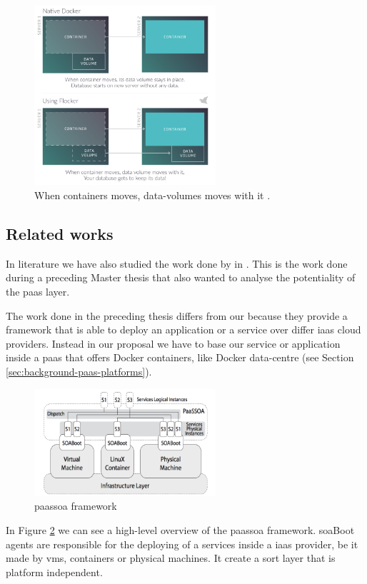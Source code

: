 \begin{figure}[h!]
	\centering{}
	\includegraphics[width=0.6\textwidth]{chapters/architecture/images/flocker.png}
	\caption[Flocker capabilities]{When containers moves, data-volumes moves with it \cite{flockerHomepage}.}
	\label{img:architecture-proposal-architecture-multiTenancy-Flocker}
\end{figure}

\subsection{Related works}
\label{sec:architecture-related}
In literature we have also studied the work done by \citeauthor{baraldo2015reconciling} in
\cite{baraldo2015reconciling}. This is the work done during a preceding Master thesis that also wanted
to analyse the potentiality of the \ac{paas} layer.

The work done in the preceding thesis differs from our because they provide a framework that is able
to deploy an application or a service over differ \ac{iaas} cloud providers. Instead in our proposal
we have to base our service or application inside a \ac{paas} that offers Docker containers, like
Docker data-centre (see Section \ref{sec:background-paas-platforms}).

\begin{figure}
	\centering{}
	\includegraphics[width=0.6\textwidth]{chapters/architecture/images/passsoa.png}
	\caption[\acs{paas}\acs{soa} framework]{\acs{paas}\acs{soa} framework \cite{baraldo2015reconciling}}
	\label{img:architecture-proposal-related}
\end{figure}

In Figure \ref{img:architecture-proposal-related} we can see a high-level overview of the \ac{paas}\ac{soa}
framework. \ac{soa}Boot agents are responsible for the deploying of a services inside a \ac{iaas} provider,
be it made by \ac{vm}s, containers or physical machines. It create a sort layer that is platform
independent.